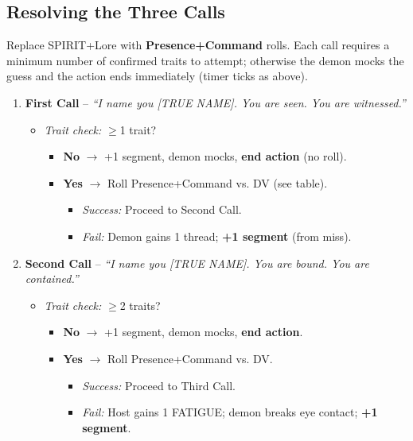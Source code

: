 \subsection*{Resolving the Three Calls}
Replace SPIRIT+Lore with \textbf{Presence+Command} rolls. Each call requires a minimum number of confirmed traits to attempt; otherwise the demon mocks the guess and the action ends immediately (timer ticks as above).

\begin{enumerate}[leftmargin=*]
\item \textbf{First Call} -- \textit{``I name you [TRUE NAME]. You are seen. You are witnessed.''}
  \begin{itemize}
    \item \textit{Trait check:} $\ge$1 trait?  
      \begin{itemize}
        \item \textbf{No} $\rightarrow$ +1 segment, demon mocks, \textbf{end action} (no roll).
        \item \textbf{Yes} $\rightarrow$ Roll Presence+Command vs. DV (see table).
          \begin{itemize}
            \item \textit{Success:} Proceed to Second Call.
            \item \textit{Fail:} Demon gains 1 thread; \textbf{+1 segment} (from miss).
          \end{itemize}
      \end{itemize}
  \end{itemize}
\item \textbf{Second Call} -- \textit{``I name you [TRUE NAME]. You are bound. You are contained.''}
  \begin{itemize}
    \item \textit{Trait check:} $\ge$2 traits?
      \begin{itemize}
        \item \textbf{No} $\rightarrow$ +1 segment, demon mocks, \textbf{end action}.
        \item \textbf{Yes} $\rightarrow$ Roll Presence+Command vs. DV.
          \begin{itemize}
            \item \textit{Success:} Proceed to Third Call.
            \item \textit{Fail:} Host gains 1 FATIGUE; demon breaks eye contact; \textbf{+1 segment}.
          \end{itemize}
      \end{itemize}

\end{itemize}
\end{enumerate}
